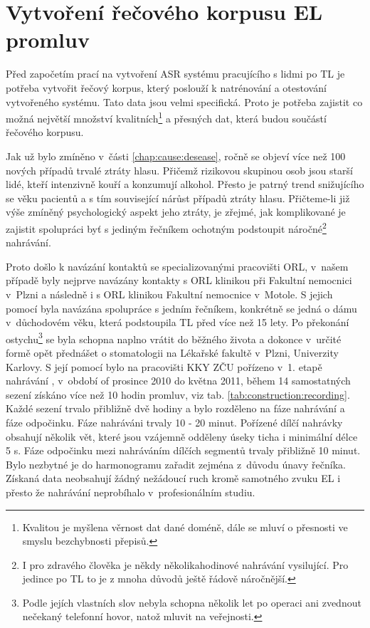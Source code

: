 \section{Vytvoření řečového korpusu EL promluv}
\label{chap:construction:corpus}

Před započetím prací na vytvoření ASR systému pracujícího s lidmi po TL je potřeba vytvořit řečový korpus, který poslouží k natrénování a otestování vytvořeného systému. Tato data jsou velmi specifická. Proto je potřeba zajistit co možná největší množství kvalitních\footnote{Kvalitou je myšlena věrnost dat dané doméně, dále se mluví o přesnosti ve smyslu bezchybnosti přepisů.} a přesných dat, která budou součástí řečového korpusu.

Jak už bylo zmíněno v~části \ref{chap:cause:desease}, ročně se objeví více než 100 nových případů trvalé ztráty hlasu. Přičemž rizikovou skupinou osob jsou starší lidé, kteří intenzivně kouří a konzumují alkohol. Přesto je patrný trend snižujícího se věku pacientů a s tím související nárůst případů ztráty hlasu. Přičteme-li již výše zmíněný psychologický aspekt jeho ztráty, je zřejmé, jak komplikované je zajistit spolupráci byť s jediným řečníkem ochotným podstoupit náročné\footnote{I pro zdravého člověka je někdy několikahodinové nahrávání vysilující. Pro jedince po TL to je z mnoha důvodů ještě řádově náročnější.} nahrávání.

Proto došlo k navázání kontaktů se specializovanými pracovišti ORL, v~našem případě byly nejprve navázány kontakty s ORL klinikou při Fakultní nemocnici v~Plzni a následně i s ORL klinikou Fakultní nemocnice v~Motole.
S jejich pomocí byla navázána spolupráce s jedním řečníkem, konkrétně se jedná o dámu v~důchodovém věku, která podstoupila TL před více než 15 lety.
Po překonání ostychu\footnote{Podle jejích vlastních slov nebyla schopna několik let po operaci ani zvednout nečekaný telefonní hovor, natož mluvit na veřejnosti.} se byla schopna naplno vrátit do běžného života a dokonce v~určité formě opět přednášet o stomatologii na Lékařské fakultě v~Plzni, Univerzity Karlovy.
S její pomocí bylo na pracovišti KKY ZČU pořízeno v~1. etapě nahrávání , v~období of prosince 2010 do května 2011, během 14 samostatných sezení získáno více než 10 hodin promluv, viz tab. \ref{tab:construction:recording}.
Každé sezení trvalo přibližně dvě hodiny a bylo rozděleno na fáze nahrávání a fáze odpočinku. Fáze nahráváni trvaly 10 - 20 minut.
Pořízené dílčí nahrávky obsahují několik vět, které jsou vzájemně odděleny úseky ticha i minimální délce 5 s. Fáze odpočinku mezi nahráváním dílčích segmentů trvaly přibližně 10 minut.
Bylo nezbytné je do harmonogramu zařadit zejména z~důvodu únavy řečníka.
Získaná data neobsahují žádný nežádoucí ruch kromě samotného zvuku EL i přesto že nahrávání neprobíhalo v~profesionálním studiu.


